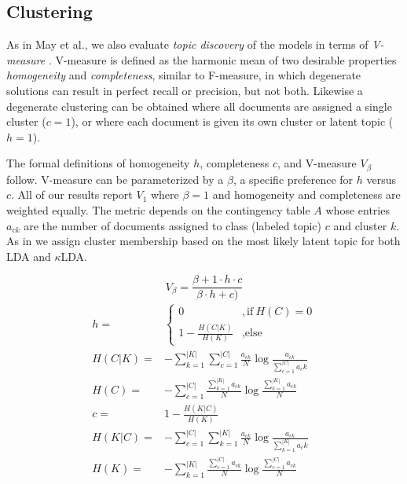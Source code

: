 \subsection{Clustering}

As in May et al.\cite{may2015}, we also evaluate \textit{topic discovery} of the models in terms of \textit{V-measure} \cite{rosenberg2007}.  V-measure is defined as the harmonic mean of two desirable properties \textit{homogeneity} and \textit{completeness}, similar to F-measure, in which degenerate solutions can result in perfect recall or precision, but not both.  Likewise a degenerate clustering can be obtained where all documents are assigned a single cluster ($c=1$), or where each document is given its own cluster or latent topic ($h=1$).

The formal definitions of homogeneity $h$, completeness $c$, and V-measure $V_\beta$ follow.  V-measure can be parameterized by a $\beta$, a specific preference for $h$ versus $c$.  All of our results report $V_1$ where $\beta=1$ and homogeneity and completeness are weighted equally.  The metric depends on the contingency table $A$ whose entries $a_{ck}$ are the number of documents assigned to class (labeled topic) $c$ and cluster $k$.  As in \cite{may2015} we assign cluster membership based on the most likely latent topic for both LDA and $\kappa$LDA. 

\begin{equation}
V_{\beta} = \frac{\beta+1 \cdot h \cdot c}{\beta \cdot h + c)} 
\end{equation}
\begin{align}
h =&  \begin{cases}
      0 &, \text{if}\ H(C)=0 \\
      1 - \frac{H(C|K)}{H(K)} &, \text{else}
    \end{cases}\\
H(C|K) =& -\sum_{k=1}^{|K|}\sum_{c=1}^{|C|}\frac{a_{ck}}{N}\log\frac{a_{ck}}{\sum_{c=1}^{|C|}a_ck} \\
H(C) =& -\sum_{c=1}^{|C|}\frac{\sum_{k=1}^{|K|}a_{ck}}{N}\log\frac{\sum_{k=1}^{|K|}a_{ck}}{N} \\
c =& 1 - \frac{H(K|C)}{H(K)} \\
H(K|C) =& -\sum_{c=1}^{|C|}\sum_{k=1}^{|K|}\frac{a_{ck}}{N}\log\frac{a_{ck}}{\sum_{k=1}^{|K|}a_ck} \\
H(K) =& -\sum_{k=1}^{|K|}\frac{\sum_{c=1}^{|C|}a_{ck}}{N}\log\frac{\sum_{c=1}^{|C|}a_{ck}}{N}
\end{align}

